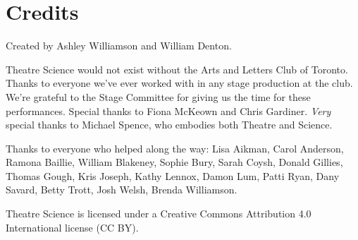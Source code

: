 \begin{mybiblist}




\end{mybiblist}

\newpage

\section{Credits}

Created by Ashley Williamson and William Denton.

Theatre Science would not exist without the Arts and Letters Club of Toronto.  Thanks to everyone we've ever worked with in any stage production at the club.  We're grateful to the Stage Committee for giving us the time for these performances.  Special thanks to Fiona McKeown and Chris Gardiner.  \textit{Very} special thanks to Michael Spence, who embodies both Theatre and Science.

Thanks to everyone who helped along the way:  Lisa Aikman, Carol Anderson, Ramona Baillie, William Blakeney, Sophie Bury, Sarah Coysh, Donald Gillies, Thomas Gough, Kris Joseph, Kathy Lennox, Damon Lum, Patti Ryan, Dany Savard, Betty Trott, Josh Welsh, Brenda Williamson.

Theatre Science is licensed under a Creative Commons Attribution 4.0 International license (CC BY).  %
